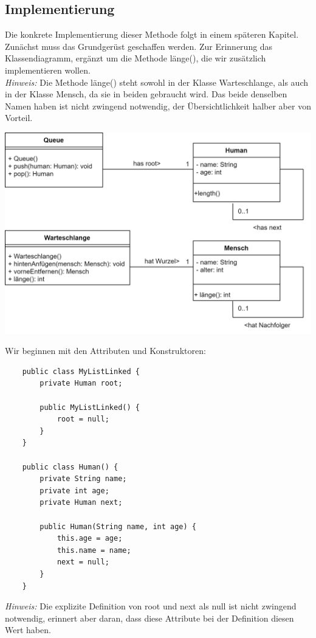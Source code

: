 \documentclass{article}
\begin{document}
\subsection{Implementierung}
Die konkrete Implementierung dieser Methode folgt in einem späteren Kapitel. Zunächst muss das
Grundgerüst geschaffen werden. Zur Erinnerung das Klassendiagramm, ergänzt um die Methode länge(), die
wir zusätzlich implementieren wollen. \\
\textit{Hinweis:} Die Methode länge() steht sowohl in der Klasse Warteschlange, als auch in der Klasse 
Mensch, da sie in beiden gebraucht wird. Das beide denselben Namen haben ist nicht zwingend notwendig,
der Übersichtlichkeit halber aber von Vorteil. 
\begin{center}
    \includegraphics[scale=0.2]{../../media/linkedlist_diagram2.png}
\end{center}
Wir beginnen mit den Attributen und Konstruktoren:
\begin{verbatim}
    public class MyListLinked {
        private Human root;

        public MyListLinked() {
            root = null;
        }
    }

    public class Human() {
        private String name; 
        private int age;
        private Human next;

        public Human(String name, int age) {
            this.age = age;
            this.name = name;
            next = null;
        }
    }
\end{verbatim}
\textit{Hinweis:} Die explizite Definition von root und next als null ist nicht zwingend notwendig, 
erinnert aber daran, dass diese Attribute bei der Definition diesen Wert haben. \\
\end{document}
